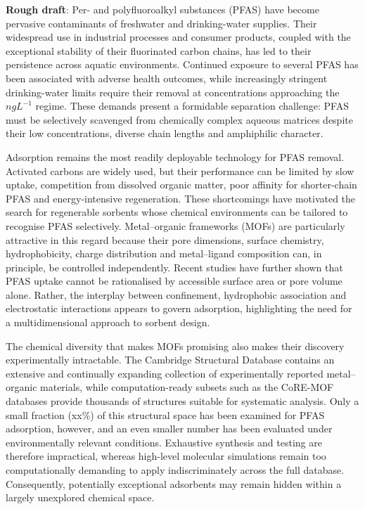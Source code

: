 \documentclass[twoside,twocolumn,9pt]{article}
\begin{document}
\textbf{Rough draft}: Per- and polyfluoroalkyl substances (PFAS) have become pervasive contaminants of freshwater and drinking-water supplies. Their widespread use in industrial processes and consumer products, coupled with the exceptional stability of their fluorinated carbon chains, has led to their persistence across aquatic environments. Continued exposure to several PFAS has been associated with adverse health outcomes, while increasingly stringent drinking-water limits require their removal at concentrations approaching the $ng L^{-1}$ regime. These demands present a formidable separation challenge: PFAS must be selectively scavenged from chemically complex aqueous matrices despite their low concentrations, diverse chain lengths and amphiphilic character.

Adsorption remains the most readily deployable technology for PFAS removal. Activated carbons are widely used, but their performance can be limited by slow uptake, competition from dissolved organic matter, poor affinity for shorter-chain PFAS and energy-intensive regeneration. These shortcomings have motivated the search for regenerable sorbents whose chemical environments can be tailored to recognise PFAS selectively. Metal–organic frameworks (MOFs) are particularly attractive in this regard because their pore dimensions, surface chemistry, hydrophobicity, charge distribution and metal–ligand composition can, in principle, be controlled independently. Recent studies have further shown that PFAS uptake cannot be rationalised by accessible surface area or pore volume alone. Rather, the interplay between confinement, hydrophobic association and electrostatic interactions appears to govern adsorption, highlighting the need for a multidimensional approach to sorbent design.

The chemical diversity that makes MOFs promising also makes their discovery experimentally intractable. The Cambridge Structural Database contains an extensive and continually expanding collection of experimentally reported metal–organic materials, while computation-ready subsets such as the CoRE-MOF databases provide thousands of structures suitable for systematic analysis. Only a small fraction (xx\%) of this structural space has been examined for PFAS adsorption, however, and an even smaller number has been evaluated under environmentally relevant conditions. Exhaustive synthesis and testing are therefore impractical, whereas high-level molecular simulations remain too computationally demanding to apply indiscriminately across the full database. Consequently, potentially exceptional adsorbents may remain hidden within a largely unexplored chemical space.
\end{document}
